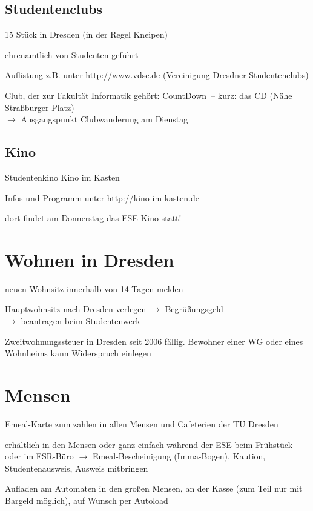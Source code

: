 \documentclass[a4paper,12pt]{report}
\begin{document}
\subsection{Studentenclubs}
\begin{itemize*}
    \item 15 Stück in Dresden (in der Regel Kneipen)
    \item ehrenamtlich von Studenten geführt
    \item  Auflistung z.B. unter http://www.vdsc.de (Vereinigung Dresdner Studentenclubs)
    \item Club, der zur Fakultät Informatik gehört: \glqq CountDown\grqq\ -- kurz: das CD (Nähe Straßburger Platz)\\
    $\rightarrow$ Ausgangspunkt Clubwanderung am Dienstag
\end{itemize*}

\subsection{Kino}
\begin{itemize*}
    \item Studentenkino \glqq Kino im Kasten\grqq
    \item Infos und Programm unter http://kino-im-kasten.de
    \item dort findet am Donnerstag das ESE-Kino statt!
\end{itemize*}


\section{Wohnen in Dresden}
\begin{itemize*}

    \item neuen Wohnsitz innerhalb von 14 Tagen melden
    \item Hauptwohnsitz nach Dresden verlegen $\rightarrow$  \glqq Begrüßungsgeld\grqq\\
  $\rightarrow$ beantragen beim Studentenwerk
  \item Zweitwohnungssteuer in Dresden seit 2006 fällig. Bewohner einer WG oder eines Wohnheims kann Widerspruch einlegen
\end{itemize*}

\section{Mensen}
\begin{itemize*}
    \item Emeal-Karte zum zahlen in allen Mensen und Cafeterien der TU Dresden
    \item erhältlich in den Mensen oder ganz einfach während der ESE beim Frühstück oder im FSR-Büro
    $\rightarrow$ Emeal-Bescheinigung (Imma-Bogen),  Kaution, Studentenausweis, Ausweis mitbringen
    \item Aufladen am Automaten in den großen Mensen, an der Kasse (zum Teil nur mit Bargeld möglich), auf Wunsch per Autoload
\end{itemize*}
\end{document}
